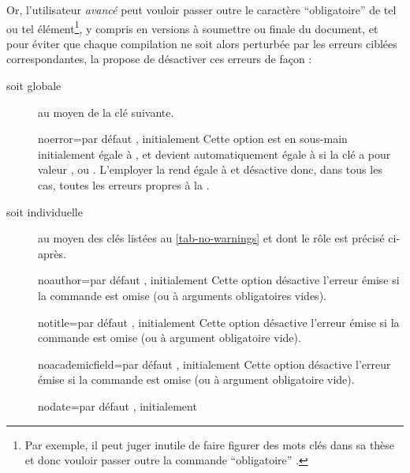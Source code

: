 Or, l'utilisateur \emph{avancé} peut vouloir passer outre le caractère
\enquote{obligatoire} de tel ou tel élément\footnote{Par exemple, il peut juger
  inutile de faire figurer des mots clés dans sa thèse et donc vouloir passer
  outre la commande \enquote{obligatoire} \protect{}.},
y compris en versions à soumettre ou finale du document, et pour éviter que
chaque compilation ne soit alors perturbée par les erreurs ciblées
correspondantes, la \yatcl{} propose de désactiver ces erreurs de façon :
\begin{description}
\item[soit globale] au moyen de la clé  suivante.
  \begin{docKey}{noerror}{=\textbar{}}{par défaut
      , initialement }
    Cette option est en sous-main initialement égale à , et
    devient automatiquement égale à  si la clé 
    a pour valeur ,  ou
    . L'employer la rend égale à  et désactive
    donc, dans tous les cas, toutes les erreurs propres à la \yatcl{}.
  \end{docKey}
\item[soit individuelle] au moyen des clés listées au \vref{tab-no-warnings} et
  dont le rôle est précisé ci-après.
  \begin{docKey}{noauthor}{=\textbar{}}{par défaut
      , initialement }
    Cette option désactive l'erreur émise si la commande  est
    omise (ou à arguments obligatoires vides).
  \end{docKey}
  \begin{docKey}{notitle}{=\textbar{}}{par défaut
      , initialement }
    Cette option désactive l'erreur émise si la commande  est
    omise (ou à argument obligatoire vide).
  \end{docKey}
  \begin{docKey}{noacademicfield}{=\textbar{}}{par
      défaut , initialement }
    Cette option désactive l'erreur émise si la commande 
    est omise (ou à argument obligatoire vide).
  \end{docKey}
  \begin{docKey}{nodate}{=\textbar{}}{par défaut
      , initialement }

\end{docKey}
\end{description}
